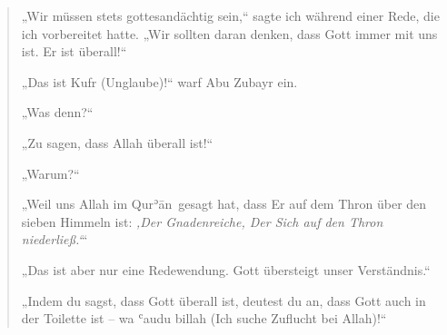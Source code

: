 \documentclass[12pt]{memoir}
\def\´{ʾ} %
\def\`{ʿ} %
\def \Quran{Qur\-\´ān} %
\begin{document}
\begin{quote}
„Wir müssen stets gottesandächtig sein,“
sagte ich während einer Rede, die ich vorbereitet hatte.
„Wir sollten daran denken, dass Gott immer mit uns ist.
Er ist überall!“

„Das ist Kufr (Unglaube)!“ warf Abu Zubayr ein.

„Was denn?“

„Zu sagen, dass Allah überall ist!“

„Warum?“

„Weil uns Allah im \Quran\ gesagt hat,
dass Er auf dem Thron über den sieben Himmeln ist:
\emph{‚Der Gnadenreiche, Der Sich auf den Thron niederließ.‘}“

„Das ist aber nur eine Redewendung.
Gott übersteigt unser Verständnis.“

„Indem du sagst, dass Gott überall ist, deutest du an,
dass Gott auch in der Toilette ist –
wa \`audu billah (Ich suche Zuflucht bei Allah)!“
\end{quote}
\end{document}
